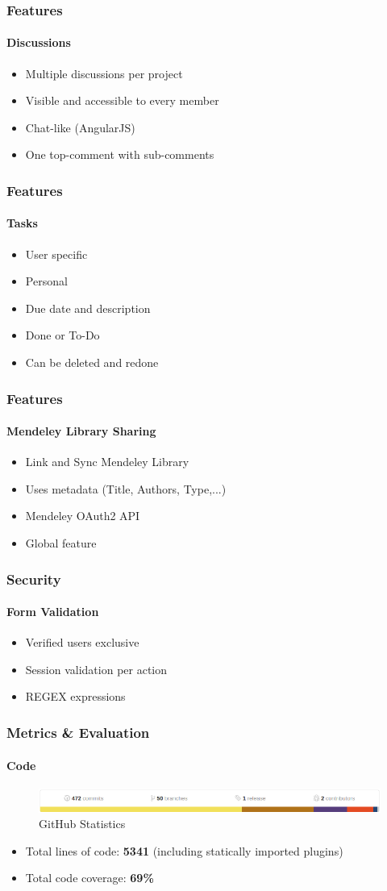 \documentclass{beamer}
\begin{document}
\begin{frame}
\frametitle{Features}
\framesubtitle{Discussions}
	\begin{itemize}
		\item Multiple discussions per project
		\item Visible and accessible to every member
		\item Chat-like (AngularJS)
		\item One top-comment with sub-comments
	\end{itemize}
\end{frame}

\begin{frame}
\frametitle{Features}
\framesubtitle{Tasks}
	\begin{itemize}
		\item User specific
		\item Personal
		\item Due date and description
		\item Done or To-Do
		\item Can be deleted and redone
	\end{itemize}
\end{frame}

\begin{frame}
\frametitle{Features}
\framesubtitle{Mendeley Library Sharing}
	\begin{itemize}
		\item Link and Sync Mendeley Library
		\item Uses metadata (Title, Authors, Type,...)
		\item Mendeley OAuth2 API
		\item Global feature
	\end{itemize}
\end{frame}

\begin{frame}
\frametitle{Security}
\framesubtitle{Form Validation}
	\begin{itemize}
		\item Verified users exclusive
		\item Session validation per action
		\item REGEX expressions
	\end{itemize}
\end{frame}

\begin{frame}
\frametitle{Metrics \& Evaluation}
\framesubtitle{Code}
	\begin{figure}
		\includegraphics[scale=0.3]{./images/github_stats.png}
		\caption{GitHub Statistics}
	\end{figure}
	\begin{itemize}
		\item Total lines of code: \textbf{5341} (including statically imported plugins)
		\item Total code coverage: \textbf{69\%}
	\end{itemize}
\end{frame}
\end{document}
